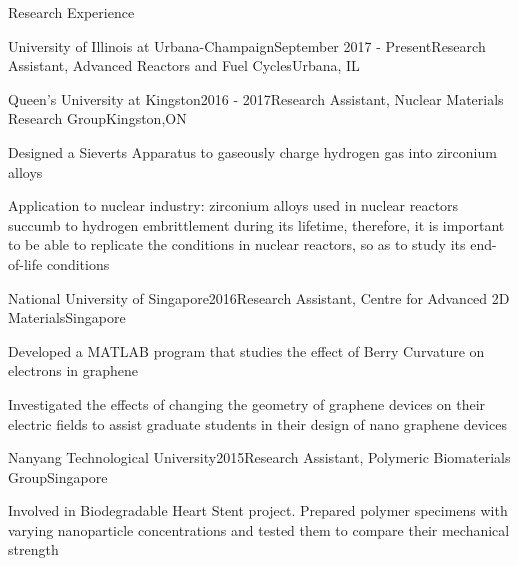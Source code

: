 \documentclass{resume2} %
\begin{document}
\begin{rSection}{Research Experience}

\begin{rSubsection}{University of Illinois at Urbana-Champaign}{September 2017 - Present}{Research Assistant, Advanced Reactors and Fuel Cycles}{Urbana, IL}
\item 
\end{rSubsection}

\begin{rSubsection}{Queen's University at Kingston}{2016 - 2017}{Research Assistant, Nuclear Materials Research Group}{Kingston,ON}
\item Designed a Sieverts Apparatus to gaseously charge hydrogen gas into zirconium alloys
\item Application to nuclear industry: zirconium alloys used in nuclear reactors succumb to hydrogen embrittlement during its lifetime, therefore, it is important to be able to replicate the conditions in nuclear reactors, so as to study its end-of-life conditions
\end{rSubsection}

\begin{rSubsection}{National University of Singapore}{2016}{Research Assistant, Centre for Advanced 2D Materials}{Singapore}
	\item Developed a MATLAB program that studies the effect of Berry Curvature on electrons in graphene
	\item Investigated the effects of changing the geometry of graphene devices on their electric fields to assist graduate students in their design of nano graphene devices
\end{rSubsection}

\begin{rSubsection}{Nanyang Technological University}{2015}{Research Assistant, Polymeric Biomaterials Group}{Singapore}
	\item Involved in Biodegradable Heart Stent project. Prepared polymer specimens with varying nanoparticle concentrations and tested them to compare their mechanical strength
\end{rSubsection}

\end{rSection}

\end{document}
